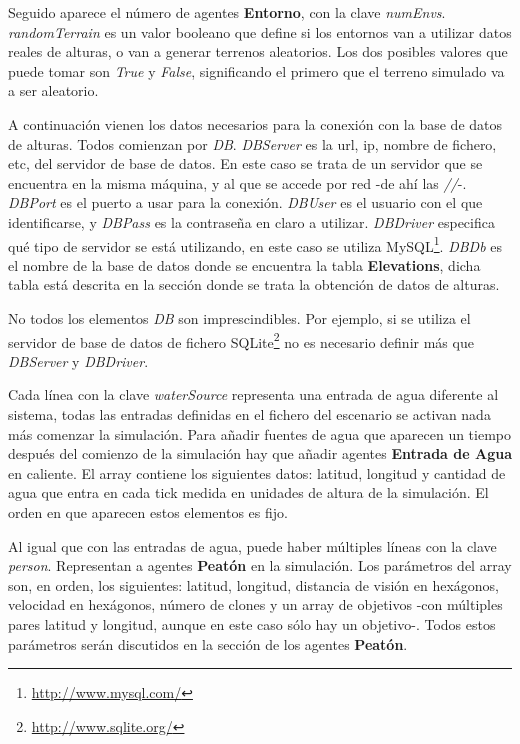 Seguido aparece el número de agentes {\bf Entorno}, con la clave {\em numEnvs}.
{\em randomTerrain} es un valor booleano que define si los entornos van a
utilizar datos reales de alturas, o van a generar terrenos aleatorios. Los dos
posibles valores que puede tomar son {\em True} y {\em False}, significando el
primero que el terreno simulado va a ser aleatorio.

A continuación vienen los datos necesarios para la conexión con la base de
datos de alturas. Todos comienzan por {\em DB}. {\em DBServer} es la url, ip,
nombre de fichero, etc, del servidor de base de datos. En este caso se trata de
un servidor que se encuentra en la misma máquina, y al que se accede por red
-de ahí las {\em //}-. {\em DBPort} es el puerto a usar para la conexión. {\em
DBUser} es el usuario con el que identificarse, y {\em DBPass} es la contraseña
en claro a utilizar. {\em DBDriver} especifica qué tipo de servidor se está
utilizando, en este caso se utiliza MySQL\footnote{\url{http://www.mysql.com/}}.
{\em DBDb} es el nombre de la base de datos donde se encuentra la tabla
{\bf Elevations}, dicha tabla está descrita en la sección donde se trata la
obtención de datos de alturas.

No todos los elementos {\em DB} son imprescindibles. Por ejemplo, si se utiliza
el servidor de base de datos de fichero
SQLite\footnote{\url{http://www.sqlite.org/}} no es necesario definir más que
{\em DBServer} y {\em DBDriver}.

Cada línea con la clave {\em waterSource} representa una entrada de agua
diferente al sistema, todas las entradas definidas en el fichero del escenario
se activan nada más comenzar la simulación. Para añadir fuentes de agua que
aparecen un tiempo después del comienzo de la simulación hay que añadir agentes
{\bf Entrada de Agua} en caliente. El array contiene los siguientes datos:
latitud, longitud y cantidad de agua que entra en cada tick medida en unidades
de altura de la simulación. El orden en que aparecen estos elementos es fijo.

Al igual que con las entradas de agua, puede haber múltiples líneas con la clave
{\em person}. Representan a agentes {\bf Peatón} en la simulación. Los
parámetros del array son, en orden, los siguientes: latitud, longitud,
distancia de visión en hexágonos, velocidad en hexágonos, número de clones y un
array de objetivos -con múltiples pares latitud y longitud, aunque en este caso
sólo hay un objetivo-. Todos estos parámetros serán discutidos en la sección de
los agentes {\bf Peatón}.

